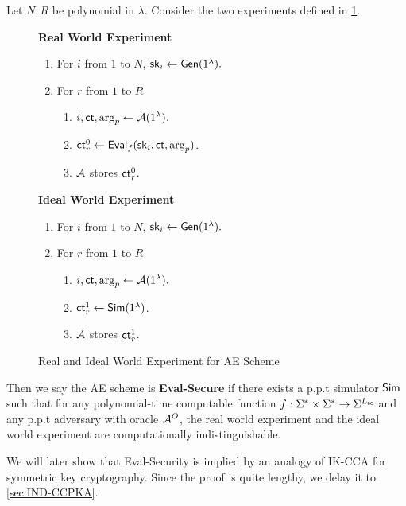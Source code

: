 \begin{definition}
\label{defn:AE-eval-security}
Let $N, R$ be polynomial in $\lambda$. Consider the two experiments defined in \cref{expr:AE-real-ideal-world}.

\begin{figure}[h!]
\begin{framed}
\textbf{Real World Experiment}
\begin{enumerate}
    \item For $i$ from $1$ to $N$, ${\mathsf{sk}}_i \leftarrow \mathsf{Gen}(1^{\lambda}).$
    \item For $r$ from $1$ to $R$
    \begin{enumerate}
        \item $i, \mathsf{ct}, \arg_p \leftarrow \mathcal{A}(1^{\lambda}).$
        \item $\mathsf{ct}^{0}_r \leftarrow \mathsf{Eval}_f({\mathsf{sk}}_i, \mathsf{ct}, \arg_p)$.
        \item $\mathcal{A}$ stores $\mathsf{ct}^{0}_r$.
    \end{enumerate}
\end{enumerate}
\textbf{Ideal World Experiment}
\begin{enumerate}
    \item For $i$ from $1$ to $N$, ${\mathsf{sk}}_i \leftarrow \mathsf{Gen}(1^{\lambda}).$
    \item For $r$ from $1$ to $R$
    \begin{enumerate}
        \item $i, \mathsf{ct}, \arg_p \leftarrow \mathcal{A}(1^{\lambda}).$
        \item $\mathsf{ct}^{1}_r \leftarrow \mathsf{Sim}(1^{\lambda})$.
        \item $\mathcal{A}$ stores $\mathsf{ct}^{1}_r$.
    \end{enumerate}
\end{enumerate}
\end{framed}
\caption{Real and Ideal World Experiment for AE Scheme}
\label{expr:AE-real-ideal-world}
\end{figure}

Then we say the AE scheme is \textbf{Eval-Secure} if there exists a p.p.t simulator $\mathsf{Sim}$ such that for any polynomial-time computable function $f: \Sigma^* \times \Sigma^* \to \Sigma^{L_{\mathsf{ae}}}$ and any p.p.t adversary with oracle $\mathcal{A}^O$, the real world experiment and the ideal world experiment are computationally indistinguishable.
\end{definition}
We will later show that Eval-Security is implied by an analogy of IK-CCA \cite[Definition 1]{BBDP01keyprivate} for symmetric key cryptography. Since the proof is quite lengthy, we delay it to \cref{sec:IND-CCPKA}.

